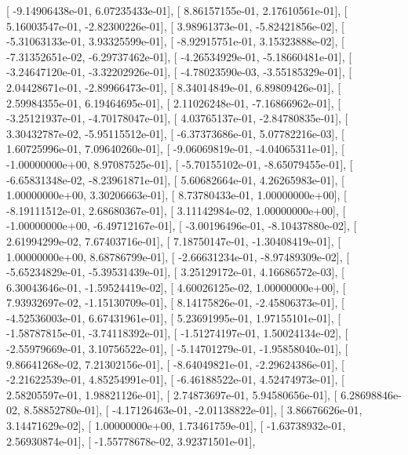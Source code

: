 \documentclass{article}
\begin{document}
       [ -9.14906438e-01,   6.07235433e-01],
       [  8.86157155e-01,   2.17610561e-01],
       [  5.16003547e-01,  -2.82300226e-01],
       [  3.98961373e-01,  -5.82421856e-02],
       [ -5.31063133e-01,   3.93325599e-01],
       [ -8.92915751e-01,   3.15323888e-02],
       [ -7.31352651e-02,  -6.29737462e-01],
       [ -4.26534929e-01,  -5.18660481e-01],
       [ -3.24647120e-01,  -3.32202926e-01],
       [ -4.78023590e-03,  -3.55185329e-01],
       [  2.04428671e-01,  -2.89966473e-01],
       [  8.34014849e-01,   6.89809426e-01],
       [  2.59984355e-01,   6.19464695e-01],
       [  2.11026248e-01,  -7.16866962e-01],
       [ -3.25121937e-01,  -4.70178047e-01],
       [  4.03765137e-01,  -2.84780835e-01],
       [  3.30432787e-02,  -5.95115512e-01],
       [ -6.37373686e-01,   5.07782216e-03],
       [  1.60725996e-01,   7.09640260e-01],
       [ -9.06069819e-01,  -4.04065311e-01],
       [ -1.00000000e+00,   8.97087525e-01],
       [ -5.70155102e-01,  -8.65079455e-01],
       [ -6.65831348e-02,  -8.23961871e-01],
       [  5.60682664e-01,   4.26265983e-01],
       [  1.00000000e+00,   3.30206663e-01],
       [  8.73780433e-01,   1.00000000e+00],
       [ -8.19111512e-01,   2.68680367e-01],
       [  3.11142984e-02,   1.00000000e+00],
       [ -1.00000000e+00,  -6.49712167e-01],
       [ -3.00196496e-01,  -8.10437880e-02],
       [  2.61994299e-02,   7.67403716e-01],
       [  7.18750147e-01,  -1.30408419e-01],
       [  1.00000000e+00,   8.68786799e-01],
       [ -2.66631234e-01,  -8.97489309e-02],
       [ -5.65234829e-01,  -5.39531439e-01],
       [  3.25129172e-01,   4.16686572e-03],
       [  6.30043646e-01,  -1.59524419e-02],
       [  4.60026125e-02,   1.00000000e+00],
       [  7.93932697e-02,  -1.15130709e-01],
       [  8.14175826e-01,  -2.45806373e-01],
       [ -4.52536003e-01,   6.67431961e-01],
       [  5.23691995e-01,   1.97155101e-01],
       [ -1.58787815e-01,  -3.74118392e-01],
       [ -1.51274197e-01,   1.50024134e-02],
       [ -2.55979669e-01,   3.10756522e-01],
       [ -5.14701279e-01,  -1.95858040e-01],
       [  9.86641268e-02,   7.21302156e-01],
       [ -8.64049821e-01,  -2.29624386e-01],
       [ -2.21622539e-01,   4.85254991e-01],
       [ -6.46188522e-01,   4.52474973e-01],
       [  2.58205597e-01,   1.98821126e-01],
       [  2.74873697e-01,   5.94580656e-01],
       [  6.28698846e-02,   8.58852780e-01],
       [ -4.17126463e-01,  -2.01138822e-01],
       [  3.86676626e-01,   3.14471629e-02],
       [  1.00000000e+00,   1.73461759e-01],
       [ -1.63738932e-01,   2.56930874e-01],
       [ -1.55778678e-02,   3.92371501e-01],
\end{document}
